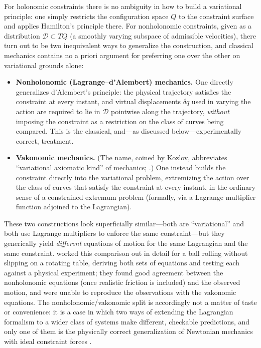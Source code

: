 For holonomic constraints there is no ambiguity in how to build a variational
principle: one simply restricts the configuration space $Q$ to the constraint
surface and applies Hamilton's principle there. For nonholonomic constraints,
given as a distribution $\mathcal{D}\subset TQ$ (a smoothly varying subspace of
admissible velocities), there turn out to be two inequivalent ways to
generalize the construction, and classical mechanics contains no a priori
argument for preferring one over the other on variational grounds alone:

\begin{itemize}
\item \textbf{Nonholonomic (Lagrange--d'Alembert) mechanics.} One directly
    generalizes d'Alembert's principle: the physical trajectory satisfies the
        constraint at every instant, and virtual displacements $\delta q$ used
        in varying the action are required to lie in $\mathcal{D}$ pointwise
        along the trajectory, \emph{without} imposing the constraint as a
        restriction on the class of curves being compared. This is the
        classical, and---as discussed below---experimentally correct,
        treatment.
\item \textbf{Vakonomic mechanics.} (The name, coined by Kozlov, abbreviates
    ``variational axiomatic kind'' of mechanics; \cite{kozlov1983,akn2006}.)
        One instead builds the constraint directly into the variational
        problem, extremizing the action over the class of curves that satisfy
        the constraint at every instant, in the ordinary sense of a constrained
        extremum problem (formally, via a Lagrange multiplier function adjoined
        to the Lagrangian).
\end{itemize}

These two constructions look superficially similar---both are ``variational''
and both use Lagrange multipliers to enforce the same constraint---but they
generically yield \emph{different} equations of motion for the same Lagrangian
and the same constraint. \cite{lewismurray1995} worked this comparison out in
detail for a ball rolling without slipping on a rotating table, deriving both
sets of equations and testing each against a physical experiment; they found
good agreement between the nonholonomic equations (once realistic friction is
included) and the observed motion, and were unable to reproduce the
observations with the vakonomic equations. The nonholonomic/vakonomic split is
accordingly not a matter of taste or convenience: it is a case in which two
ways of extending the Lagrangian formalism to a wider class of systems make
different, checkable predictions, and only one of them is the physically
correct generalization of Newtonian mechanics with ideal constraint forces
\cite{neimarkfufaev1972,bloch2003}.

